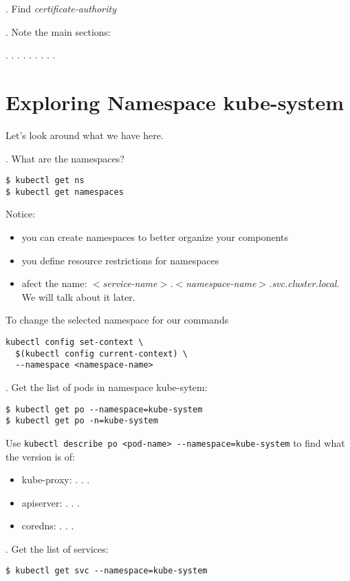 \documentclass[12pt, letterpaper]{article}
\begin{document}
. Find \textit{certificate-authority}

. Note the main sections:

   . . .
   . . .
   . . .

%
%
%
\section{Exploring Namespace kube-system}

Let's look around what we have here.

. What are the namespaces?

\begin{verbatim}
$ kubectl get ns
$ kubectl get namespaces
\end{verbatim}

Notice:
\begin{itemize}
    \item you can create namespaces to better organize your components
    \item you define resource restrictions for namespaces
    \item afect the name: \textit{$<$service-name$>$.$<$namespace-name$>$.svc.cluster.local}. We will talk about it later.
\end{itemize}

To change the selected namespace for our commands

\begin{verbatim}
kubectl config set-context \
  $(kubectl config current-context) \
  --namespace <namespace-name>
\end{verbatim}

. Get the list of pods in namespace kube-sytem:

\begin{verbatim}
$ kubectl get po --namespace=kube-system
$ kubectl get po -n=kube-system
\end{verbatim}

Use \verb|kubectl describe po <pod-name> --namespace=kube-system| to find what the version is of:
\begin{itemize}
    \item kube-proxy: . . .
    \item apiserver: . . .
    \item coredns: . . .
\end{itemize}

. Get the list of services:

\begin{verbatim}
$ kubectl get svc --namespace=kube-system
\end{verbatim}
\end{document}
